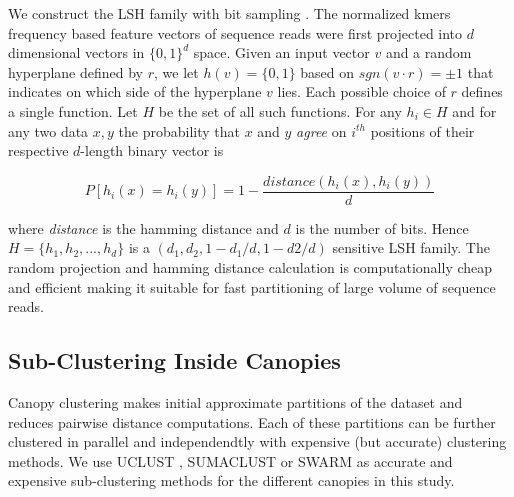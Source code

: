 \documentclass[10pt, conference, compsocconf]{IEEEtran}
\begin{document}
We construct the LSH family with bit sampling \cite{indyk1998approximate}. The normalized kmers frequency based feature vectors of sequence reads 
were first projected into $d$ dimensional vectors in $\{0,1\}^d$ space. Given an 
input vector $v$ and a random hyperplane defined by $r$, we let $h(v)=\{0,1\}$ based on $sgn(v\cdot{r})=\pm{1}$ that indicates on which 
side of the hyperplane $v$ lies. Each possible choice of $r$ defines a single function. Let $H$ be the set of all 
such functions. For any $h_i\in{H}$ and for any two data $x,y$ the probability that $x$ and $y$ \emph{agree} on $i^{th}$ positions of their 
respective $d$-length binary vector is

\begin{equation}
P[h_i(x)=h_i(y)]=1-\frac{distance(h_i(x),h_i(y))}{d} 
\end{equation}

where \emph{distance} is the hamming distance and $d$ is the number of bits. Hence $H=\{h_1,h_2,...,h_d\}$ is a $(d_1,d_2,1-d_1/d,1-d2/d)$ sensitive LSH family. The 
random projection and hamming distance calculation is computationally cheap and efficient making it 
suitable for fast partitioning of large volume of 
sequence reads. 



\subsection{\textbf{Sub-Clustering Inside Canopies}}
\label{sub-cluster}

Canopy clustering  makes initial approximate partitions of the dataset and reduces pairwise
distance computations. Each of these partitions can be further clustered in parallel and independendtly 
with  expensive (but accurate)  clustering methods. 
%
We use UCLUST \cite{MARuclust}, SUMACLUST \cite{MARSumaclust} or 
SWARM \cite{MARSwarm2}  as accurate and 
expensive sub-clustering methods  for the different 
canopies in this study. 
\end{document}
